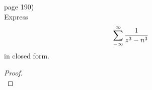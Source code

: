 \documentclass{article}
\newenvironment{problem}[2][Problem]{\begin{trivlist}
\item[\hskip \labelsep {\bfseries #1}\hskip \labelsep {\bfseries #2.}]}{\end{trivlist}}
\begin{document}
\begin{problem}{2} (page 190) \\
  Express \[
    \sum\displaylimits_{-\infty}^\infty \frac{1}{z^3 - n^3}
  \] in closed form.
\end{problem}
\begin{proof} \text{} \\
\end{proof}
\end{document}

